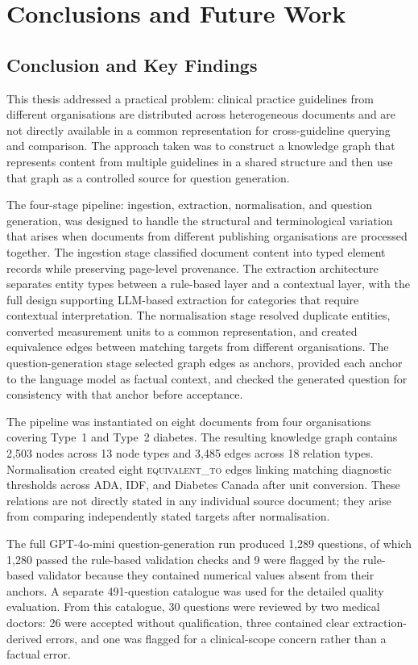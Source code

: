 \chapter{Conclusions and Future Work}
\label{chap:conclusion}

\section{Conclusion and Key Findings}
This thesis addressed a practical problem: clinical practice guidelines
from different organisations are distributed across heterogeneous documents
and are not directly available in a common representation for
cross-guideline querying and comparison. The approach taken was to construct
a knowledge graph that represents content from multiple guidelines in a
shared structure and then use that graph as a controlled source for
question generation.

The four-stage pipeline: ingestion, extraction, normalisation, and question
generation, was designed to handle the structural and terminological
variation that arises when documents from different publishing
organisations are processed together. The ingestion stage classified
document content into typed element records while preserving page-level
provenance. The extraction architecture separates entity types between a
rule-based layer and a contextual layer, with the full design supporting
LLM-based extraction for categories that require contextual interpretation.
The normalisation stage resolved duplicate entities, converted measurement
units to a common representation, and created equivalence edges between
matching targets from different organisations. The question-generation
stage selected graph edges as anchors, provided each anchor to the language
model as factual context, and checked the generated question for consistency
with that anchor before acceptance.

The pipeline was instantiated on eight documents from four organisations
covering Type~1 and Type~2 diabetes. The resulting knowledge graph contains
2,503 nodes across 13 node types and 3,485 edges across 18 relation types.
Normalisation created eight \textsc{equivalent\_to} edges linking matching
diagnostic thresholds across ADA, IDF, and Diabetes Canada after unit
conversion. These relations are not directly stated in any individual
source document; they arise from comparing independently stated targets
after normalisation.

The full GPT-4o-mini question-generation run produced 1,289 questions, of which 1,280 passed the rule-based validation checks and 9 were flagged by the rule-based validator because they contained numerical values absent from their anchors. A separate 491-question
catalogue was used for the detailed quality evaluation. From this catalogue, 30 questions were reviewed by two medical doctors:
26 were accepted without qualification, three contained clear
extraction-derived errors, and one was flagged for a clinical-scope
concern rather than a factual error.

